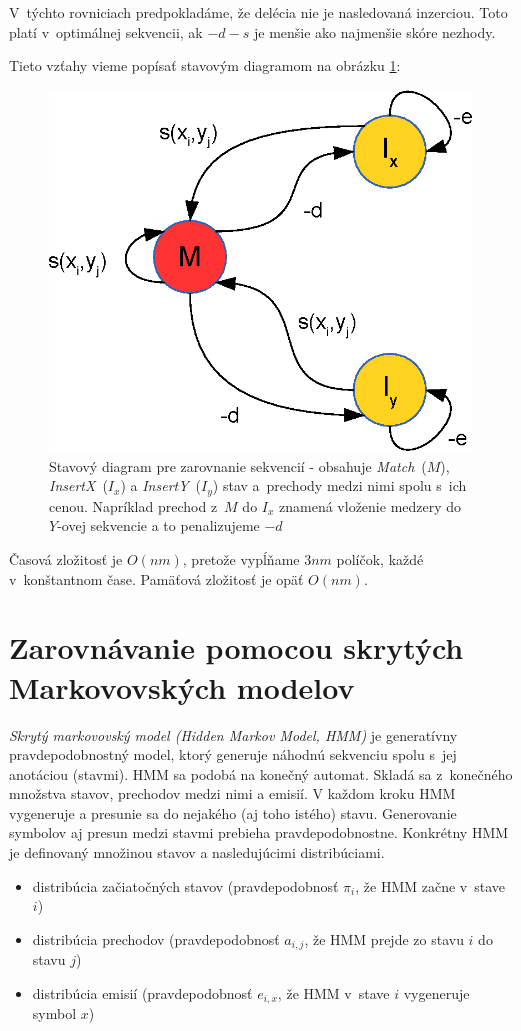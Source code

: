 V~týchto rovniciach predpokladáme, že delécia nie je nasledovaná inzerciou. Toto platí v~optimálnej sekvencii, ak $-d-s$ je menšie ako najmenšie skóre nezhody.

Tieto vzťahy vieme popísať stavovým diagramom na obrázku \ref{fig:alignment-fsa}:
\begin{figure}[h]
    \centering
    \includegraphics[width=.4\textwidth]{images/alignment_fsa}
    \caption[Stavový diagram pre zarovnanie sekvencií]{Stavový diagram pre zarovnanie sekvencií - obsahuje \textit{Match}~($M$), \textit{InsertX}~($I_x$) a \textit{InsertY}~($I_y$) stav a~prechody medzi nimi spolu s~ich cenou. Napríklad prechod z~$M$ do $I_x$ znamená vloženie medzery do $Y$-ovej sekvencie a to penalizujeme $-d$}
    \label{fig:alignment-fsa}
\end{figure}

Časová zložitosť je $O(nm)$, pretože vypĺňame $3nm$ políčok, každé v~konštantnom čase. Pamäťová zložitosť je opäť $O(nm)$.

\cite{durbin}

\section[Zarovnávanie s~pHMM]{Zarovnávanie pomocou skrytých Markovovských modelov}
\label{sec:hmm-alignment}

\textit{Skrytý markovovský model (Hidden Markov Model, HMM)} je generatívny pravdepodobnostný model, ktorý generuje náhodnú sekvenciu spolu s~jej anotáciou (stavmi). HMM sa podobá na konečný automat. Skladá sa z~konečného množstva stavov, prechodov medzi nimi a emisií.
V každom kroku HMM vygeneruje a presunie sa do nejakého (aj toho istého) stavu. Generovanie symbolov aj presun medzi stavmi prebieha pravdepodobnostne.
Konkrétny HMM je definovaný množinou stavov a nasledujúcimi distribúciami.
\begin{itemize}
\item distribúcia začiatočných stavov (pravdepodobnosť $\pi_i$, že HMM začne v~stave $i$)
\item distribúcia prechodov (pravdepodobnosť $a_{i,j}$, že HMM prejde zo stavu $i$ do stavu $j$)
\item distribúcia emisií (pravdepodobnosť $e_{i,x}$, že HMM v~stave $i$ vygeneruje symbol $x$)
\end{itemize}

